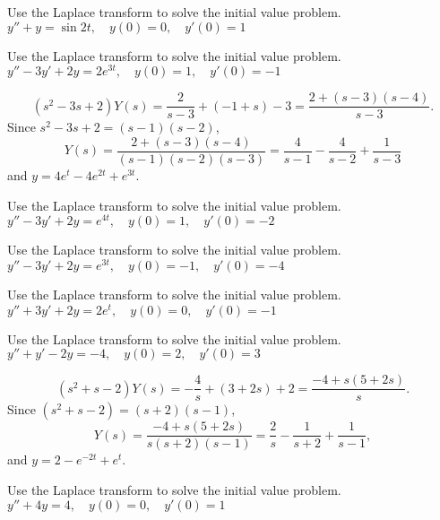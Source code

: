 \documentclass{ximera}
\begin{document}
\begin{problem}\label{exer:8.3.7} Use the Laplace transform to solve the initial value problem. $y''+y=\sin2t, \quad  y(0)=0,\quad y'(0)=1$
\end{problem}

\begin{problem}\label{exer:8.3.8} Use the Laplace transform to solve the initial value problem. $y''-3y'+2y=2e^{3t}, \quad  y(0)=1,\quad y'(0)=-1$

\begin{solution}
$$
 (s^2-3s+2)Y(s)=\frac{2}{s-3}+(-1+s)-3=\frac{2+(s-3)(s-4)}{s-3}.
$$
Since $s^2-3s+2=(s-1)(s-2)$,
$$
Y(s)=\frac{2+(s-3)(s-4)}{(s-1)(s-2)(s-3)}=
\frac{4}{s-1}-\frac{4}{s-2}+\frac{1}{s-3}
$$
and
  $y=4e^t-4e^{2t}+e^{3t}$.
\end{solution}
\end{problem}

\begin{problem}\label{exer:8.3.9} Use the Laplace transform to solve the initial value problem. $y''-3y'+2y=e^{4t}, \quad  y(0)=1,\quad y'(0)=-2$
\end{problem}

\begin{problem}\label{exer:8.3.10} Use the Laplace transform to solve the initial value problem. $y''-3y'+2y=e^{3t}, \quad  y(0)=-1,\quad y'(0)=-4$
\end{problem}

\begin{problem}\label{exer:8.3.11} Use the Laplace transform to solve the initial value problem. $y''+3y'+2y=2e^t, \quad  y(0)=0,\quad y'(0)=-1$
\end{problem}

\begin{problem}\label{exer:8.3.12} Use the Laplace transform to solve the initial value problem. $y''+y'-2y=-4, \quad  y(0)=2,\quad y'(0)=3$

\begin{solution}
$$
(s^2+s-2)Y(s)=-\frac{4}{s}+(3+2s)+2=\frac{-4+s(5+2s)}{s}.
$$
Since $(s^2+s-2)=(s+2)(s-1)$,
$$
Y(s)=\frac{-4+s(5+2s)}{s(s+2)(s-1)}
=\frac{2}{s}-\frac{1}{s+2}+\frac{1}{s-1},
$$
and  $y=2-e^{-2t}+e^t$.
\end{solution}
\end{problem}

\begin{problem}\label{exer:8.3.13} Use the Laplace transform to solve the initial value problem. $y''+4y=4, \quad  y(0)=0,\quad y'(0)=1$
\end{problem}
\end{document}
